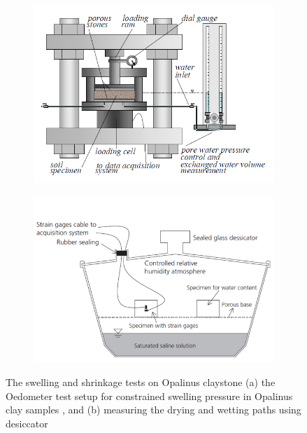 \begin{figure}[!ht]
\begin{subfigure}[c]{0.48\textwidth}
\includegraphics[width=1\textwidth]{figures/Amir_Shrinkage_Swelling_Setup.png}
\subcaption{}
\label{fig:Amir_Shrinkage_Swelling_Setup}
\end{subfigure}
\hfill
\begin{subfigure}[c]{0.48\textwidth}
\includegraphics[width=1\textwidth]{figures/Amir_Shrinkage_Minardi.png}
\subcaption{}
\label{fig:Amir_Shrinkage_Minardi}
\end{subfigure}
\caption{The swelling and shrinkage tests on Opalinus claystone (a) the Oedometer test setup for constrained swelling pressure in Opalinus clay samples \cite{Peronetal2009}, and (b) measuring the drying and wetting paths using desiccator \cite{Minardietal2016}}
\end{figure}

